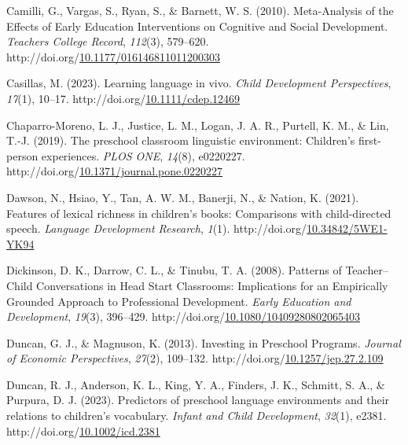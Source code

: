 \documentclass[10pt, letterpaper]{article}
\newlength{\cslhangindent}
\newlength{\cslentryspacingunit} %
\newenvironment{CSLReferences}[2] %
{%
	\setlength{\parindent}{0pt}
	\ifodd #1
	\let\oldpar\par
	\def\par{\hangindent=\cslhangindent\oldpar}
	\fi
}%
{}
\begin{document}
\begin{CSLReferences}{1}{0}
\leavevmode{}%
Camilli, G., Vargas, S., Ryan, S., \& Barnett, W. S. (2010).
Meta-{Analysis} of the {Effects} of {Early Education Interventions} on
{Cognitive} and {Social Development}. \emph{Teachers College Record},
\emph{112}(3), 579--620.
http://doi.org/\href{https://doi.org/10.1177/016146811011200303}{10.1177/016146811011200303}

\leavevmode{}%
Casillas, M. (2023). Learning language in vivo. \emph{Child Development
Perspectives}, \emph{17}(1), 10--17.
http://doi.org/\href{https://doi.org/10.1111/cdep.12469}{10.1111/cdep.12469}

\leavevmode{}%
Chaparro-Moreno, L. J., Justice, L. M., Logan, J. A. R., Purtell, K. M.,
\& Lin, T.-J. (2019). The preschool classroom linguistic environment:
{Children}'s first-person experiences. \emph{PLOS ONE}, \emph{14}(8),
e0220227.
http://doi.org/\href{https://doi.org/10.1371/journal.pone.0220227}{10.1371/journal.pone.0220227}

\leavevmode{}%
Dawson, N., Hsiao, Y., Tan, A. W. M., Banerji, N., \& Nation, K. (2021).
Features of lexical richness in children's books: {Comparisons} with
child-directed speech. \emph{Language Development Research},
\emph{1}(1).
http://doi.org/\href{https://doi.org/10.34842/5WE1-YK94}{10.34842/5WE1-YK94}

\leavevmode{}%
Dickinson, D. K., Darrow, C. L., \& Tinubu, T. A. (2008). Patterns of
{Teacher}--{Child Conversations} in {Head Start Classrooms}:
{Implications} for an {Empirically Grounded Approach} to {Professional
Development}. \emph{Early Education and Development}, \emph{19}(3),
396--429.
http://doi.org/\href{https://doi.org/10.1080/10409280802065403}{10.1080/10409280802065403}

\leavevmode{}%
Duncan, G. J., \& Magnuson, K. (2013). Investing in {Preschool
Programs}. \emph{Journal of Economic Perspectives}, \emph{27}(2),
109--132.
http://doi.org/\href{https://doi.org/10.1257/jep.27.2.109}{10.1257/jep.27.2.109}

\leavevmode{}%
Duncan, R. J., Anderson, K. L., King, Y. A., Finders, J. K., Schmitt, S.
A., \& Purpura, D. J. (2023). Predictors of preschool language
environments and their relations to children's vocabulary. \emph{Infant
and Child Development}, \emph{32}(1), e2381.
http://doi.org/\href{https://doi.org/10.1002/icd.2381}{10.1002/icd.2381}


\end{CSLReferences}
\end{document}
